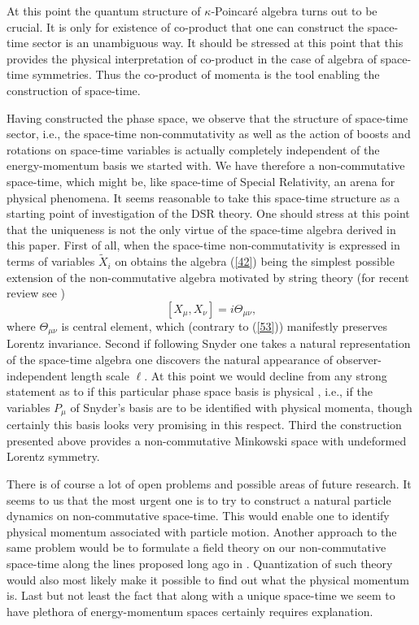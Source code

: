 \documentclass [prd,twocolumn,nofootinbib,showpacs]  {revtex4}
\begin{document}
At this point the quantum structure of $\kappa$-Poincar\'e algebra
turns out to be crucial.  It is only for existence of co-product
that one can construct the space-time sector is an unambiguous
way. It should be stressed at this point that this provides the
physical interpretation of co-product in the case of algebra of
space-time symmetries. Thus the co-product of momenta is the tool
enabling the construction of space-time.

Having constructed the phase space, we observe that the structure
of space-time sector, i.e.,  the space-time non-commutativity as
well as the action of boosts and rotations on space-time variables
is actually completely independent of the energy-momentum basis we
started with. We have therefore a non-commutative space-time,
which might be, like space-time of Special Relativity, an arena
for physical phenomena. It seems  reasonable to take this
space-time structure as a starting point of investigation of the
DSR theory. One should stress at this point that the uniqueness is
not the only virtue of the space-time algebra derived in this
paper. First of all, when the space-time non-commutativity is
expressed in terms of variables $\tilde{X}_i$ on obtains the
algebra (\ref{42}) being the simplest possible extension of the
non-commutative algebra motivated by string theory (for recent
review see \cite{douglasnekrasov})
\begin{equation}\label{53}
  [X_\mu, X_\nu] = i \Theta_{\mu\nu},
\end{equation}
where $\Theta_{\mu\nu}$ is central element, which  (contrary to
(\ref{53})) manifestly preserves  Lorentz invariance. Second if
following Snyder \cite{snyder} one takes a natural representation
of the space-time algebra one discovers the natural appearance of
observer-independent length scale $\ell$. At this point we would
decline from any strong statement as to if this particular phase
space basis is physical , i.e., if the variables $P_\mu$ of
Snyder's basis are to be identified with physical momenta, though
certainly this basis looks very promising in this respect. Third
the construction presented above provides a non-commutative
Minkowski space with undeformed Lorentz symmetry.

There is of course a lot of open problems and possible areas of
future research.  It seems to us that the most urgent one is to
try to construct a natural particle dynamics on non-commutative
space-time. This would enable one to identify physical momentum
associated with particle motion. Another approach to the same
problem would be to formulate a field theory on our
non-commutative space-time along the lines proposed long ago in
\cite{snyder2}. Quantization of such theory would also most likely
make it possible to find out what the physical momentum is. Last
but not least the fact that along with a unique space-time we seem
to have plethora of energy-momentum spaces certainly requires
explanation.
\end{document}
